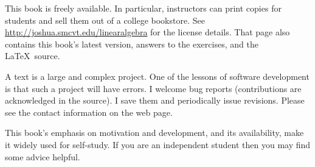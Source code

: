 {\medskip
{}
This book is freely available.
In particular, instructors can print copies for students 
and sell them out of a college bookstore.
See 
\url{http://joshua.smcvt.edu/linearalgebra}
for the license details.
That page also contains this book's latest version,
answers to the exercises, and the \LaTeX\ source.

A text is a large and complex project. 
One of the lessons of software
development is that such a project will have errors.
I welcome bug reports
(contributions are acknowledged in the source).
I save them and periodically issue revisions.
Please see the contact information on the web page.


\newcommand{\classday}[1]{\textsc{#1}}
\newcommand{\colwidth}{1.25in}

\medskip
{}
%
This book's emphasis on motivation and development,
and its availability, make it widely used for self-study.
If you are an independent student 
then you may find some advice helpful.

}
